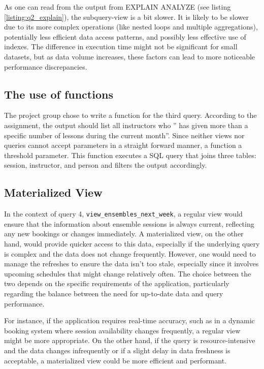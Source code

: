 \documentclass[a4paper]{scrartcl}
\begin{document}
As one can read from the output from EXPLAIN ANALYZE
(see listing \ref{listing:q2_explain}),
the subquery-view is a bit slower.
It is likely to be slower due to its more complex operations (like
nested loops and multiple aggregations), potentially less efficient data access
patterns, and possibly less effective use of indexes.
The difference in
execution time might not be significant for small datasets, but as data volume
increases, these factors can lead to more noticeable performance discrepancies.

\subsection*{The use of functions}
The project group chose to write a function for the third query.
According to the assignment, the output should list all instructors who
'' has given more than a specific number of lessons during the current month''.
Since neither views nor queries cannot accept parameters in a straight forward manner,
a function a threshold parameter.
This function executes a SQL query that joins three tables: session, instructor, and person
and filters the output accordingly.

\subsection*{Materialized View}
\label{subsec:materializedview}
In the context of query 4,
\texttt{view_ensembles_next_week},
a regular view would ensure that the information about ensemble sessions is always current,
reflecting any new bookings or changes immediately.
A materialized view, on the other hand, would provide quicker access to this data,
especially if the underlying query is complex and the data does not change frequently.
However, one would need to manage the refreshes to ensure the data isn't too stale,
especially since it involves upcoming schedules that might change relatively often.
The choice between the two depends on the specific requirements of the application,
particularly regarding the balance between the need for up-to-date data and query performance.

For instance, if the application requires real-time accuracy,
such as in a dynamic booking system where session availability changes frequently,
a regular view might be more appropriate.
On the other hand, if the query is resource-intensive and the data changes infrequently or
if a slight delay in data freshness is acceptable, a materialized view could be more efficient and performant.
\end{document}
